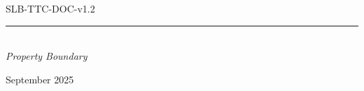 %
%
%
%
%
%
%
%

\begin{titlepage}

\thispagestyle{empty}

\begin{flushleft}
SLB-TTC-DOC-v1.2
\end{flushleft}

\vspace{1cm}

\begin{flushleft}
\Huge{\textbf{\thetitle}}
\rule[0pt]{\textwidth}{5pt}
\end{flushleft}

\vspace{0.2cm}

\begin{flushleft}
\textit{\thetitle} \\
\textit{Property Boundary}
\end{flushleft}

\vfill
\vfill

\begin{flushright}
September 2025
\end{flushright}

\end{titlepage}

